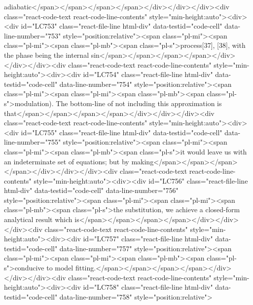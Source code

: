 {{{{{{{{adiabatic</span></span></span></span></div></div></div><div class="react-code-text react-code-line-contents" style="min-height:auto"><div><div id="LC753" class="react-file-line html-div" data-testid="code-cell" data-line-number="753" style="position:relative"><span class="pl-mi"><span class="pl-mi"><span class="pl-mb"><span class="pl-s">process{[}37{]}, {[}38{]}, with the phase being the internal sin</span></span></span></span></div></div></div><div class="react-code-text react-code-line-contents" style="min-height:auto"><div><div id="LC754" class="react-file-line html-div" data-testid="code-cell" data-line-number="754" style="position:relative"><span class="pl-mi"><span class="pl-mi"><span class="pl-mb"><span class="pl-s">modulation). The bottom-line of not including this approximation is that</span></span></span></span></div></div></div><div class="react-code-text react-code-line-contents" style="min-height:auto"><div><div id="LC755" class="react-file-line html-div" data-testid="code-cell" data-line-number="755" style="position:relative"><span class="pl-mi"><span class="pl-mi"><span class="pl-mb"><span class="pl-s">it would leave us with an indeterminate set of equations; but by making</span></span></span></span></div></div></div><div class="react-code-text react-code-line-contents" style="min-height:auto"><div><div id="LC756" class="react-file-line html-div" data-testid="code-cell" data-line-number="756" style="position:relative"><span class="pl-mi"><span class="pl-mi"><span class="pl-mb"><span class="pl-s">the substitution, we achieve a closed-form analytical result which is</span></span></span></span></div></div></div><div class="react-code-text react-code-line-contents" style="min-height:auto"><div><div id="LC757" class="react-file-line html-div" data-testid="code-cell" data-line-number="757" style="position:relative"><span class="pl-mi"><span class="pl-mi"><span class="pl-mb"><span class="pl-s">conducive to model fitting.</span></span></span></span></div></div></div><div class="react-code-text react-code-line-contents" style="min-height:auto"><div><div id="LC758" class="react-file-line html-div" data-testid="code-cell" data-line-number="758" style="position:relative">
}}}}}}}}

